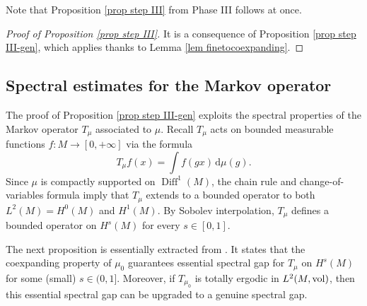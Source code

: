 \documentclass[11pt, leqno, fleqn]{amsart}
\newcommand{\margem}[1]{\marginpar{{\scriptsize {#1}}}}
\def\clo{   \color{orange}}
\def \N{{\mathbb N}}
\newcommand{\dd}{\,\mathrm{d}}
\theoremstyle{definition}
\DeclareMathOperator{\diff}{Diff}
\theoremstyle{definition}
\def \vol{  {\rm vol} }
\newcommand{\Diff}{{\rm Diff}}
\begin{document}
Note that Proposition \ref{prop step III} from Phase III follows at once.

\begin{proof}[Proof of Proposition \ref{prop step III}]
It is a consequence  of Proposition \ref{prop step III-gen}, which applies thanks to Lemma \ref{lem finetocoexpanding}.
\end{proof}


\subsection{Spectral estimates for the Markov operator} \label{Sec-spec}
The proof of Proposition \ref{prop step III-gen}  exploits  the spectral properties of the Markov operator $T_{\mu}$  associated to $\mu$. Recall $T_{\mu}$  acts on  bounded measurable functions $f:M\rightarrow [0, +\infty]$ via the formula
$$ T_{\mu}f(x)= \int  f(gx) \dd\mu( g).$$ 
Since $\mu$ is compactly supported on $\diff^1(M)$, the chain rule and change-of-variables formula imply that  $T_{\mu}$ extends to a  bounded operator to both $L^2(M)=H^{0}(M)$ and $H^1(M)$. 
By Sobolev interpolation, $T_{\mu}$ defines a bounded operator on $H^s(M)$ for every $s \in [0,1]$.
 




The next proposition is essentially extracted from \cite{DD, T3}. It states that the coexpanding property of $\mu_{0}$ guarantees essential spectral gap  for $T_{\mu}$ on $H^s(M)$ for some (small) $s \in (0, 1]$. Moreover, if $T_{\mu_{0}}$ is totally ergodic in $L^2(M, \vol)$, then this essential spectral gap can be upgraded to a genuine spectral gap. 
	
		
\end{document}
